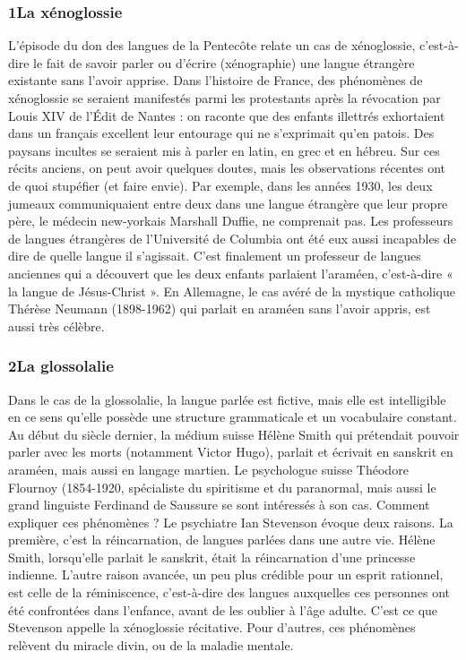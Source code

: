 \subsubsection*{1\quad La xénoglossie}
L’épisode du don des langues de la Pentecôte relate un cas de xénoglossie, c’est-à-dire le fait de savoir parler ou d’écrire (xénographie) une langue étrangère existante sans l’avoir apprise. Dans l’histoire de France, des phénomènes de xénoglossie se seraient manifestés parmi les protestants après la révocation par Louis XIV de l’Édit de Nantes : on raconte que des enfants illettrés exhortaient dans un français excellent leur entourage qui ne s’exprimait qu’en patois. Des paysans incultes se seraient mis à parler en latin, en grec et en hébreu. Sur ces récits anciens, on peut avoir quelques doutes, mais les observations récentes ont de quoi stupéfier (et faire envie). Par exemple, dans les années 1930, les deux jumeaux communiquaient entre deux dans une langue étrangère que leur propre père, le médecin new-yorkais Marshall Duffie, ne comprenait pas. Les professeurs de langues étrangères de l’Université de Columbia ont été eux aussi incapables de dire de quelle langue il s’agissait. C’est finalement un professeur de langues anciennes qui a découvert que les deux enfants parlaient l’araméen, c’est-à-dire « la langue de Jésus-Christ ». En Allemagne, le cas avéré de la mystique catholique Thérèse Neumann (1898-1962) qui parlait en araméen sans l’avoir appris, est aussi très célèbre.
\subsubsection*{2\quad La glossolalie}
Dans le cas de la glossolalie, la langue parlée est fictive, mais elle est intelligible en ce sens qu’elle possède une structure grammaticale et un vocabulaire constant. Au début du siècle dernier, la médium suisse Hélène Smith qui prétendait pouvoir parler avec les morts (notamment Victor Hugo), parlait et écrivait en sanskrit en araméen, mais aussi en langage martien. Le psychologue suisse Théodore Flournoy (1854-1920, spécialiste du spiritisme et du paranormal, mais aussi le grand linguiste Ferdinand de Saussure se sont intéressés à son cas. Comment expliquer ces phénomènes ? Le psychiatre Ian Stevenson évoque deux raisons. La première, c’est la réincarnation, de langues parlées dans une autre vie. Hélène Smith, lorsqu’elle parlait le sanskrit, était la réincarnation d’une princesse indienne. L’autre raison avancée, un peu plus crédible pour un esprit rationnel, est celle de la réminiscence, c’est-à-dire des langues auxquelles ces personnes ont été confrontées dans l’enfance, avant de les oublier à l’âge adulte. C’est ce que Stevenson appelle la xénoglossie récitative. Pour d’autres, ces phénomènes relèvent du miracle divin, ou de la maladie mentale.

